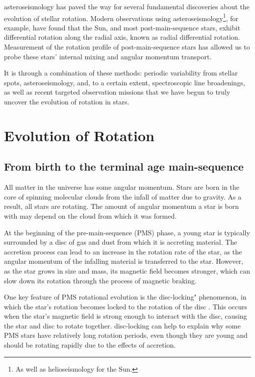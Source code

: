 asteroseismology has paved the way for several fundamental discoveries about the evolution of stellar rotation.
Modern observations using asteroseismology\footnote{As well as helioseismology for the Sun.}, for example, have found that the Sun, and most post-main-sequence stars, exhibit differential rotation along the radial axis, known as radial differential rotation.
Measurement of the rotation profile of post-main-sequence stars has allowed us to probe these stars' internal mixing and angular momentum transport. 

It is through a combination of these methods: periodic variability from stellar spots, asteroseismology, and, to a certain extent, spectroscopic line broadenings, as well as recent targeted observation missions that we have begun to truly uncover the evolution of rotation in stars.

\section{Evolution of Rotation}
\label{sec:evolution}


\subsection{From birth to the terminal age main-sequence}

All matter in the universe has some angular momentum. 
Stars are born in the core of spinning molecular clouds from the infall of matter due to gravity. 
As a result, all stars are rotating.
The amount of angular momentum a star is born with may depend on the cloud from which it was formed.

At the beginning of the pre-main-sequence (PMS) phase, a young star is typically surrounded by a disc of gas and dust from which it is accreting material.
The accretion process can lead to an increase in the rotation rate of the star, as the angular momentum of the infalling material is transferred to the star.
However, as the star grows in size and mass, its magnetic field becomes stronger, which can slow down its rotation through the process of magnetic braking.

One key feature of PMS rotational evolution is the disc-locking" phenomenon, in which the star's rotation becomes locked to the rotation of the disc \citep{eggenberger_angular_2012}.
This occurs when the star's magnetic field is strong enough to interact with the disc, causing the star and disc to rotate together.
disc-locking can help to explain why some PMS stars have relatively long rotation periods, even though they are young and should be rotating rapidly due to the effects of accretion.


